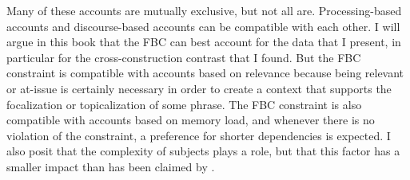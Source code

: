 Many of these accounts are mutually exclusive, but not all are. Processing-based accounts and discourse-based accounts can be compatible with each other. I will argue in this book that the FBC can best account for the data that I present, in particular for the cross-construction contrast that I found. But the FBC constraint is compatible with accounts based on relevance because being relevant or at-issue is certainly necessary in order to create a context that supports the focalization or topicalization of some phrase. The FBC constraint is also compatible with accounts based on memory load, and whenever there is no violation of the constraint, a preference for shorter dependencies is expected. I also posit that the complexity of subjects plays a role, but that this factor has a smaller impact than has been claimed by \citet{Kluender.2004}. 

